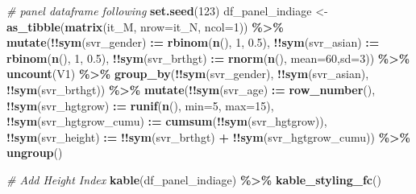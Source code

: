 \documentclass[
]{book}
\newenvironment{Shaded}{\begin{snugshade}}{\end{snugshade}}
\newcommand{\CommentTok}[1]{\textcolor[rgb]{0.56,0.35,0.01}{\textit{#1}}}
\newcommand{\DataTypeTok}[1]{\textcolor[rgb]{0.13,0.29,0.53}{#1}}
\newcommand{\DecValTok}[1]{\textcolor[rgb]{0.00,0.00,0.81}{#1}}
\newcommand{\ErrorTok}[1]{\textcolor[rgb]{0.64,0.00,0.00}{\textbf{#1}}}
\newcommand{\FloatTok}[1]{\textcolor[rgb]{0.00,0.00,0.81}{#1}}
\newcommand{\KeywordTok}[1]{\textcolor[rgb]{0.13,0.29,0.53}{\textbf{#1}}}
\newcommand{\NormalTok}[1]{#1}
\newcommand{\OperatorTok}[1]{\textcolor[rgb]{0.81,0.36,0.00}{\textbf{#1}}}
\newcommand{\StringTok}[1]{\textcolor[rgb]{0.31,0.60,0.02}{#1}}
\begin{document}
\begin{Shaded}
\begin{Highlighting}[]
\CommentTok{\# panel dataframe following}
\KeywordTok{set.seed}\NormalTok{(}\DecValTok{123}\NormalTok{)}
\NormalTok{df\_panel\_indiage \textless{}{-}}\StringTok{ }\KeywordTok{as\_tibble}\NormalTok{(}\KeywordTok{matrix}\NormalTok{(it\_M, }\DataTypeTok{nrow=}\NormalTok{it\_N, }\DataTypeTok{ncol=}\DecValTok{1}\NormalTok{)) }\OperatorTok{\%\textgreater{}\%}
\StringTok{  }\KeywordTok{mutate}\NormalTok{(}\OperatorTok{!!}\KeywordTok{sym}\NormalTok{(svr\_gender) }\OperatorTok{:}\ErrorTok{=}\StringTok{ }\KeywordTok{rbinom}\NormalTok{(}\KeywordTok{n}\NormalTok{(), }\DecValTok{1}\NormalTok{, }\FloatTok{0.5}\NormalTok{),}
         \OperatorTok{!!}\KeywordTok{sym}\NormalTok{(svr\_asian) }\OperatorTok{:}\ErrorTok{=}\StringTok{ }\KeywordTok{rbinom}\NormalTok{(}\KeywordTok{n}\NormalTok{(), }\DecValTok{1}\NormalTok{, }\FloatTok{0.5}\NormalTok{),}
         \OperatorTok{!!}\KeywordTok{sym}\NormalTok{(svr\_brthgt) }\OperatorTok{:}\ErrorTok{=}\StringTok{ }\KeywordTok{rnorm}\NormalTok{(}\KeywordTok{n}\NormalTok{(), }\DataTypeTok{mean=}\DecValTok{60}\NormalTok{,}\DataTypeTok{sd=}\DecValTok{3}\NormalTok{)) }\OperatorTok{\%\textgreater{}\%}
\StringTok{  }\KeywordTok{uncount}\NormalTok{(V1) }\OperatorTok{\%\textgreater{}\%}
\StringTok{  }\KeywordTok{group\_by}\NormalTok{(}\OperatorTok{!!}\KeywordTok{sym}\NormalTok{(svr\_gender), }\OperatorTok{!!}\KeywordTok{sym}\NormalTok{(svr\_asian), }\OperatorTok{!!}\KeywordTok{sym}\NormalTok{(svr\_brthgt)) }\OperatorTok{\%\textgreater{}\%}
\StringTok{  }\KeywordTok{mutate}\NormalTok{(}\OperatorTok{!!}\KeywordTok{sym}\NormalTok{(svr\_age) }\OperatorTok{:}\ErrorTok{=}\StringTok{ }\KeywordTok{row\_number}\NormalTok{(),}
         \OperatorTok{!!}\KeywordTok{sym}\NormalTok{(svr\_hgtgrow) }\OperatorTok{:}\ErrorTok{=}\StringTok{ }\KeywordTok{runif}\NormalTok{(}\KeywordTok{n}\NormalTok{(), }\DataTypeTok{min=}\DecValTok{5}\NormalTok{, }\DataTypeTok{max=}\DecValTok{15}\NormalTok{),}
         \OperatorTok{!!}\KeywordTok{sym}\NormalTok{(svr\_hgtgrow\_cumu) }\OperatorTok{:}\ErrorTok{=}\StringTok{ }\KeywordTok{cumsum}\NormalTok{(}\OperatorTok{!!}\KeywordTok{sym}\NormalTok{(svr\_hgtgrow)),}
         \OperatorTok{!!}\KeywordTok{sym}\NormalTok{(svr\_height) }\OperatorTok{:}\ErrorTok{=}\StringTok{ }\OperatorTok{!!}\KeywordTok{sym}\NormalTok{(svr\_brthgt) }\OperatorTok{+}\StringTok{ }\OperatorTok{!!}\KeywordTok{sym}\NormalTok{(svr\_hgtgrow\_cumu))  }\OperatorTok{\%\textgreater{}\%}
\StringTok{  }\KeywordTok{ungroup}\NormalTok{()}

\CommentTok{\# Add Height Index}
\KeywordTok{kable}\NormalTok{(df\_panel\_indiage) }\OperatorTok{\%\textgreater{}\%}\StringTok{ }\KeywordTok{kable\_styling\_fc}\NormalTok{()}
\end{Highlighting}
\end{Shaded}
\end{document}
